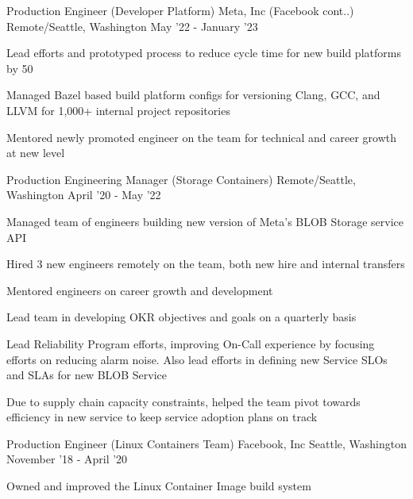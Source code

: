 \begin{cventries}
\cventry
	{Production Engineer \color{solarized-orange}(Developer Platform)} %
	{Meta, Inc (Facebook cont..)} %
    {Remote/Seattle, Washington} %
    {May '22 - January '23} %
    {
        \begin{cvitems}
          \item Lead efforts and prototyped process to reduce cycle time for new build platforms by 50%
          \item Managed Bazel based build platform configs for versioning Clang, GCC, and LLVM for 1,000+ internal project repositories
          \item Mentored newly promoted engineer on the team for technical and career growth at new level
        \end{cvitems}
    }
\vspace{1mm}
\cventry
	{Production Engineering Manager \color{solarized-orange}(Storage Containers)} %
    {} %
    {Remote/Seattle, Washington} %
    {April '20 - May '22} %
    {
        \begin{cvitems}
          \item Managed team of engineers building new version of Meta’s BLOB Storage service API
		  \item Hired 3 new engineers remotely on the team, both new hire and internal transfers
		  \item Mentored engineers on career growth and development
		  \item Lead team in developing OKR objectives and goals on a quarterly basis
          \item Lead Reliability Program efforts, improving On-Call experience by focusing efforts on reducing alarm noise. Also lead efforts in defining new Service SLOs and SLAs for new BLOB Service
          \item Due to supply chain capacity constraints, helped the team pivot towards efficiency in new service to keep service adoption plans on track
        \end{cvitems}
    }
\vspace{2mm}
\cventry
	{Production Engineer \color{solarized-orange}(Linux Containers Team)} %
    {Facebook, Inc} %
    {Seattle, Washington} %
    {November '18 - April '20} %
    {
        \begin{cvitems}
          \item Owned and improved the Linux Container Image build system

\end{cvitems}}
\end{cventries}
